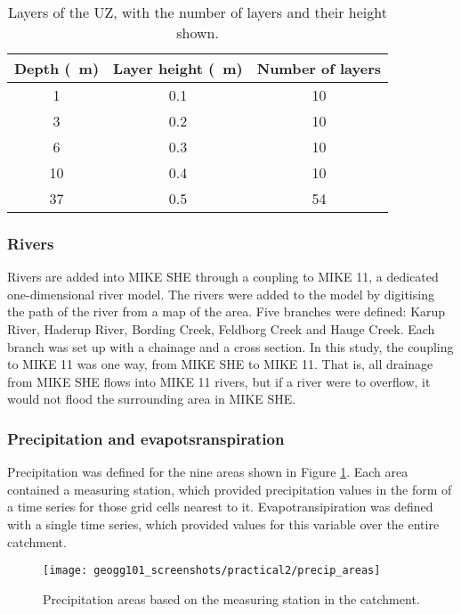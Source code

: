 \documentclass{article}
\begin{document}
\setlength\extrarowheight{3pt}
\begin{table}[!h]
    \centering
    \begin{tabular}{c c c}
	Depth (\SI{}{m})  & Layer height (\SI{}{m}) & Number of layers \\
	    \hline
	    1 & 0.1 & 10 \\
	    3 & 0.2 & 10 \\
	    6 & 0.3 & 10 \\
	    10 & 0.4 & 10 \\
	    37 & 0.5 & 54 \\
    \end{tabular}
    \caption{Layers of the UZ, with the number of layers and their height shown.}
    \label{table:uz_depths}
\end{table}



\subsubsection{Rivers}

Rivers are added into MIKE SHE through a coupling to MIKE 11, a dedicated one-dimensional river model. The rivers were added to the model by digitising the path of the river from a map of the area. Five branches were defined: Karup River, Haderup River, Bording Creek, Feldborg Creek and Hauge Creek. Each branch was set up with a chainage and a cross section. In this study, the coupling to MIKE 11 was one way, from MIKE SHE to MIKE 11. That is, all drainage from MIKE SHE flows into MIKE 11 rivers, but if a river were to overflow, it would not flood the surrounding area in MIKE SHE.

\subsubsection{Precipitation and evapotsranspiration}

Precipitation was defined for the nine areas shown in Figure \ref{fig:precip_areas}. Each area contained a measuring station, which provided precipitation values in the form of a time series for those grid cells nearest to it. Evapotransipiration was defined with a single time series, which provided values for this variable over the entire catchment.

\begin{figure}[!h]
    \centering
    \texttt{[image: geogg101\_screenshots/practical2/precip\_areas]}
    \caption{Precipitation areas based on the measuring station in the catchment.}
    \label{fig:precip_areas}
\end{figure}
\end{document}
